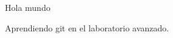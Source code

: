 \documentclass{article}
\begin{document}
 

Hola mundo 

Aprendiendo git en el laboratorio avanzado. 
\end{document}
